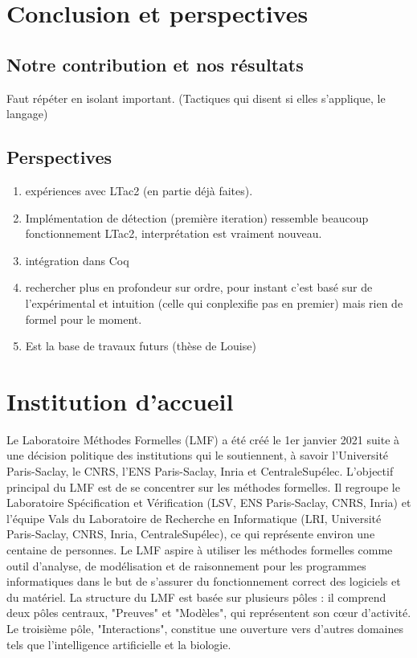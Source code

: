 \documentclass[titlepage,draft]{article}
\begin{document}
\section{Conclusion et perspectives}
\subsection{Notre contribution et nos résultats}
Faut répéter en isolant important. (Tactiques qui disent si elles s'applique, le langage)
\subsection{Perspectives}
\begin{enumerate}
    \item expériences avec LTac2 (en partie déjà faites).
    \item Implémentation de détection (première iteration) ressemble beaucoup fonctionnement LTac2, interprétation est vraiment nouveau.
    \item intégration dans Coq
    \item rechercher plus en profondeur sur ordre, pour instant c'est basé sur de l'expérimental et intuition (celle qui conplexifie pas en premier) mais rien de formel pour le moment.
    \item Est la base de travaux futurs (thèse de Louise)
\end{enumerate}















\newpage
\appendix
\section{Institution d'accueil}
Le Laboratoire Méthodes Formelles (LMF) a été créé le 1er janvier 2021 suite à une décision politique des institutions qui le soutiennent, à savoir l'Université Paris-Saclay, le CNRS, l'ENS Paris-Saclay, Inria et CentraleSupélec. L'objectif principal du LMF est de se concentrer sur les méthodes formelles. Il regroupe le Laboratoire Spécification et Vérification (LSV, ENS Paris-Saclay, CNRS, Inria) et l'équipe Vals du Laboratoire de Recherche en Informatique (LRI, Université Paris-Saclay, CNRS, Inria, CentraleSupélec), ce qui représente environ une centaine de personnes.
Le LMF aspire à utiliser les méthodes formelles comme outil d'analyse, de modélisation et de raisonnement pour les programmes informatiques dans le but de s'assurer du fonctionnement correct des logiciels et du matériel.
La structure du LMF est basée sur plusieurs pôles : il comprend deux pôles centraux, "Preuves" et "Modèles", qui représentent son cœur d'activité. Le troisième pôle, "Interactions", constitue une ouverture vers d'autres domaines tels que l'intelligence artificielle et la biologie.



\newpage


\end{document}
